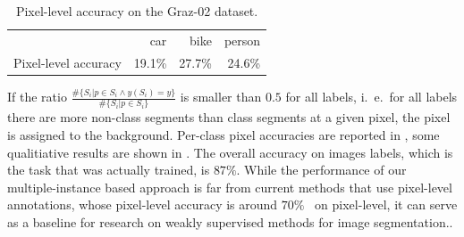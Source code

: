 \begin{table}
    \centering
    \vspace{-6mm}
    \begin{tabularx}{0.8\textwidth}{lRRR}
    \toprule
                & car & bike & person \\
    \cmidrule(l){2-2}
    \cmidrule(l){3-3}
    \cmidrule(l){4-4}
        Pixel-level accuracy&   19.1\%&  27.7\%&  24.6\% \\
    \bottomrule
    \end{tabularx}
    \vspace{1mm}
    \caption{Pixel-level accuracy on the Graz-02 dataset.}
    \vspace{-8mm}
\end{table}
If the ratio $\frac{\#\{S_i | p \in S_i \land y(S_i)=y \}}{\#\{S_i | p \in S_i \}}$ 
is smaller than $0.5$ for all labels, i.\ e.\ for all labels there are more
non-class segments than class segments at a given pixel, the pixel
is assigned to the background.
Per-class pixel accuracies are reported in , some qualitiative results are shown in . The overall
accuracy on images labels, which is the task that was actually trained, is $87\%$.
While the performance of our multiple-instance based approach is far
from current methods that use pixel-level annotations, whose pixel-level accuracy is around $70\%$~\cite{fulkerson2009class} on pixel-level,
it can serve as a baseline for research on weakly supervised methods for image segmentation..
